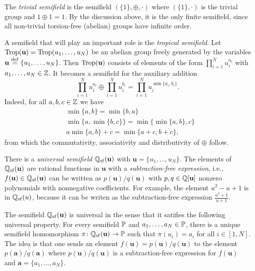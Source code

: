 \renewcommand{\bmu}{\mathbf{u}}
\renewcommand{\bma}{\mathbf{a}}

\begin{example}

	The \emph{trivial semifield} is the semifield $(\{1\}, \oplus,
		\cdot)$ where $(\{1\}, \cdot)$ is the trivial group and $1 \oplus 1 = 1$. By the
	discussion above, it is the only finite semifield, since all non-trivial torsion-free
	(abelian) groups have infinite order.
\end{example}
\begin{example}

	A semifield that will play an important role is the \emph{tropical
		semifield}. Let $\Trop(\bmu) = \Trop(u_1, \dots, u_N)$ be an
	abelian group freely generated by the variables $\bmu \defeq \{u_1, \dots, u_N\}$. Then
	$\Trop(\bmu)$ consists of elements of the form $\prod_{i=1}^N u_i^{a_i}$ with $a_1,
		\dots, a_N \in \mathbb{Z}$. It becomes a semifield for the auxiliary addition
	\begin{equation*}
		\prod_{i=1}^N u_i^{a_i}  \oplus \prod_{i=1}^N u_i^{b_i} =  \prod_{i=1}^N u_i^{\min\{a_i, b_i\}}.
	\end{equation*}
	Indeed, for all $a,b,c \in \mathbb{Z}$ we have
	\begin{align*}
		 & \min \{a,b \} = \min \{b, a\}                    \\
		 & \min \{a, \min\{b,c\}\} = \min\{\min\{a,b\}, c\} \\
		 & a \min \{a, b\} + c = \min\{a + c, b + c\},
	\end{align*}
	from which the commutativity, associativity and distributivity of $\oplus$ follow.

\end{example}

\begin{example}

	There is a \emph{universal semifield} $\bbQ_{{\tsf}}(\bmu)$
	with $\bmu = \{u_1, \dots, u_N\}$. The elements of $\bbQ_{\tsf}(\bmu)$ are rational
	functions in $\bmu$ with a \emph{subtraction-free expression},
	i.e., $f(\bmu) \in \bbQ_{\tsf}(\bmu)$ can be written as $p(\bmu) / q (\bmu)$ with $p, q
		\in \bbQ[\bmu]$ nonzero polynomials with nonnegative coefficients. For example, the
	element $u^2 - u + 1$ is in $\mathbb{Q}_{\operatorname{sf}}(u)$, because it can be writen as the
	subtraction-free expression $\frac{u^3 + 1}{u + 1}$.

	The semifield $\bbQ_{{\tsf}}(\bmu)$ is universal in the sense that it satifies the
	following universal property. For every semifield $\mathbb{P}$ and $a_1, \dots, a_N \in
		\mathbb{P}$, there is a unique semifield homomorphism $\pi \colon \bbQ_{\tsf}(\bmu) \to \bbP$
	such that $\pi(u_i) = a_i$ for all $i \in [1, N]$. The idea is that one sends an
	element $f(\bmu) = p(\bmu) / q(\bmu)$ to the element $p(\bma) / q(\bma)$ where $p(\bmu)
		/ q(\bmu)$ is a subtraction-free expression for $f(\bmu)$ and $\bma = \{a_1, \dots,
		a_N\}$.
\end{example}

